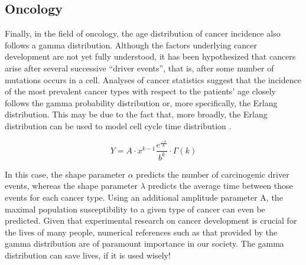 \documentclass[12pt]{article}
\begin{document}
\subsection{Oncology}
Finally, in the field of oncology, the age distribution of cancer incidence also follows a gamma distribution. Although
the factors underlying cancer development are not yet fully understood, it has been hypothesized that cancers arise
after several successive “driver events”, that is, after some number of mutations occurs in a cell. Analyses of cancer
statistics suggest that the incidence of the most prevalent cancer types with respect to the patients' age closely
follows the gamma probability distribution or, more specifically, the Erlang distribution. This may be due to the fact
that, more broadly, the Erlang distribution can be used to model cell cycle time
distribution\cite{belikovNumberKeyCarcinogenic2017} .

\begin{equation}
	Y = A\cdot x^{k-1}\frac{e^{\frac{-x}{b}}}{b^k}\cdot\Gamma(k)
\end{equation}

In this case, the shape parameter $\alpha$ predicts the number of carcinogenic driver events, whereas the shape
parameter $\lambda$ predicts the average time between those events for each cancer type. Using an additional amplitude
parameter A, the maximal population susceptibility to a given type of cancer can even be
predicted\cite{belikovNumberKeyCarcinogenic2017}. Given that experimental research on cancer development is crucial for
the lives of many people, numerical references such as that provided by the gamma distribution are of paramount
importance in our society. The gamma distribution can save lives, if it is used wisely!


\end{document}
